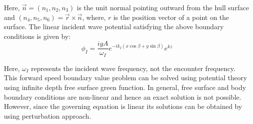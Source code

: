 \newpage
Here, $\vec{n} = (n_1, n_2, n_3)$ is the unit normal pointing outward from 
the hull surface and $(n_4, n_5, n_6)=\vec{r}\times \vec{n}$, where, $r$ 
is the position vector of a point on the surface. The linear incident wave 
potential satisfying the above boundary conditions is given by:
\begin{equation}
    \phi_I = \frac{igA}{\omega_I} e^{-ik_I(x\cos \beta + y\sin \beta)}e^{kz}
\end{equation}

 Here, $\omega_I$ represents the incident wave frequency, not the encounter frequency.
This forward speed boundary value problem can be solved using potential theory using 
infinite depth free surface green function. In general, free surface and body boundary conditions 
are non-linear and hence an exact solution is not possible. However, since the governing equation
is linear its solutions can be obtained by using perturbation approach.